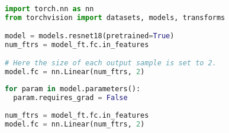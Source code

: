 \begin{lstlisting}[language=Python,caption={Using pretrained ResNet18},captionpos=b]

import torch.nn as nn
from torchvision import datasets, models, transforms

model = models.resnet18(pretrained=True)
num_ftrs = model_ft.fc.in_features

# Here the size of each output sample is set to 2.
model.fc = nn.Linear(num_ftrs, 2)

\end{lstlisting}

\begin{lstlisting}[language=Python,caption={Freezing model parameters},captionpos=b]
for param in model.parameters():
  param.requires_grad = False
  
num_ftrs = model_ft.fc.in_features
model.fc = nn.Linear(num_ftrs, 2)
\end{lstlisting}

